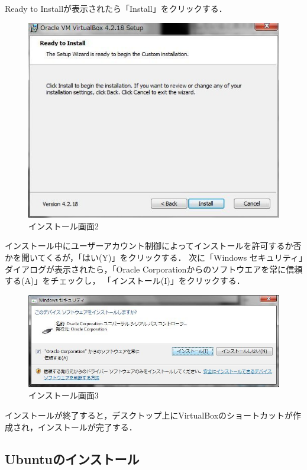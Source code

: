 Ready to Installが表示されたら「Install」をクリックする．
\begin{figure}[htb]
\centering
\includegraphics[width=15cm]{setup2.png}
\caption{インストール画面2}\label{virtualboxインストール画面2}
\end{figure}

インストール中にユーザーアカウント制御によってインストールを許可するか否かを聞いてくるが，「はい(Y)」をクリックする．
次に「Windows セキュリティ」ダイアログが表示されたら，「Oracle Corporationからのソフトウエアを常に信頼する(A)」をチェックし，
「インストール(I)」をクリックする．

\begin{figure}[htb]
\centering
\includegraphics[width=15cm]{setup3.png}
\caption{インストール画面3}\label{virtualboxインストール画面3}
\end{figure}
インストールが終了すると，デスクトップ上にVirtualBoxのショートカットが作成され，インストールが完了する．


\clearpage


\subsection{Ubuntuのインストール}

